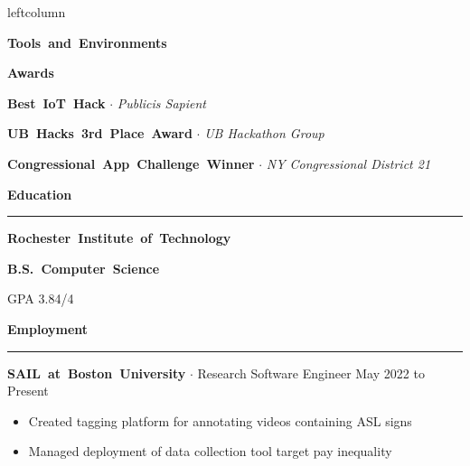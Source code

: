 \documentclass{article}
\newcommand{\rSection}[1] {
  \textcolor{header-blue} {
    \textbf{{\fontsize{0.5cm}{0.45cm}\selectfont \hbox{#1}}} \\
    \rule{0.30\textwidth}{0.1cm}
  }
}
\newcommand{\rSubSection}[1] {
  \textbf{{\fontsize{0.4cm}{0.45cm}\selectfont \hbox{#1}}}
}
\newcommand{\rSubSubSection}[1] {
  \textbf{{\fontsize{0.35cm}{0.45cm}\selectfont \hbox{#1}}}
}
\newcommand\level[2]{%
  \tikz{%
    \ifx#20
    \else
      \foreach \i in {1,...,#2} {
        \filldraw[black!20] (\i ex,0) circle (0.4ex);
      };
    \fi
    \ifx#10
    \else
      \foreach \i in {1,...,#1} {
        \filldraw[black] (\i ex,0) circle (0.4ex);
      };
    \fi
  }
}
\begin{document}
\begin{dynamiccontents*}{leftcolumn}
    \rSubSection{Tools and Environments} \par \bigskip
    \vspace{-10pt}

    \rSubSection{Awards} \par

\rSubSubSection{Best IoT Hack} $ \cdot $ \textit{Publicis Sapient} \par

\rSubSubSection{UB Hacks 3rd Place Award} $ \cdot $ \textit{UB Hackathon Group} \par

\rSubSubSection{Congressional App Challenge Winner} $ \cdot $ \textit{NY Congressional District 21} \par

\end{dynamiccontents*}

\rSection{Education} \par \bigskip
\rSubSubSection{Rochester Institute of Technology} \par
\rSubSubSection{B.S. Computer Science} \par
GPA 3.84/4 \par

\rSection{Employment} \par

\rSubSubSection{SAIL at Boston University} $ \cdot $ Research Software Engineer \hfill May 2022 to Present \par
\vspace{-10pt}
\begin{itemize}
    \setlength\itemsep{0pt}
    \setlength{\parskip}{0pt}
    \item Created tagging platform for annotating videos containing ASL signs
    \item Managed deployment of data collection tool target pay inequality
\end{itemize}
\vspace{-10pt}
\end{document}
